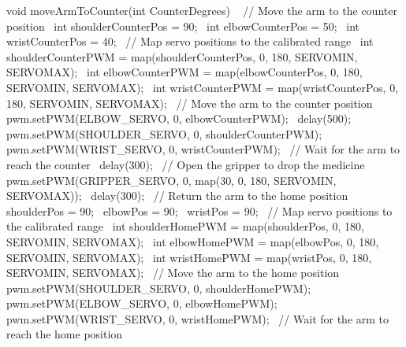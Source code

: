 void moveArmToCounter(int CounterDegrees) 
{  
	// Move the arm to the counter position  
	int shoulderCounterPos = 90;  
	int elbowCounterPos = 50; 
	int wristCounterPos = 40;  
	// Map servo positions to the calibrated range 
	int shoulderCounterPWM = map(shoulderCounterPos, 0, 180, SERVOMIN, SERVOMAX);  
	int elbowCounterPWM = map(elbowCounterPos, 0, 180, SERVOMIN, SERVOMAX);  
	int wristCounterPWM = map(wristCounterPos, 0, 180, SERVOMIN, SERVOMAX);  
	// Move the arm to the counter position 
	pwm.setPWM(ELBOW_SERVO, 0, elbowCounterPWM);  
	delay(500); 
	pwm.setPWM(SHOULDER_SERVO, 0, shoulderCounterPWM);  
	pwm.setPWM(WRIST_SERVO, 0, wristCounterPWM); 
	// Wait for the arm to reach the counter  delay(300);  
	// Open the gripper to drop the medicine  
	pwm.setPWM(GRIPPER_SERVO, 0,
	map(30, 0, 180, SERVOMIN, SERVOMAX));  
	delay(300);  
	// Return the arm to the home position  
	shoulderPos = 90;  
	elbowPos = 90;  
	wristPos = 90;  
	// Map servo positions to the calibrated range 
	int shoulderHomePWM = map(shoulderPos, 0, 180, SERVOMIN, SERVOMAX); 
	int elbowHomePWM = map(elbowPos, 0, 180, SERVOMIN, SERVOMAX); 
	int wristHomePWM = map(wristPos, 0, 180, SERVOMIN, SERVOMAX);  
	// Move the arm to the home position  
	pwm.setPWM(SHOULDER_SERVO, 0, shoulderHomePWM);  
	pwm.setPWM(ELBOW_SERVO, 0, elbowHomePWM); 
	pwm.setPWM(WRIST_SERVO, 0, wristHomePWM);  
	// Wait for the arm to reach the home position
}